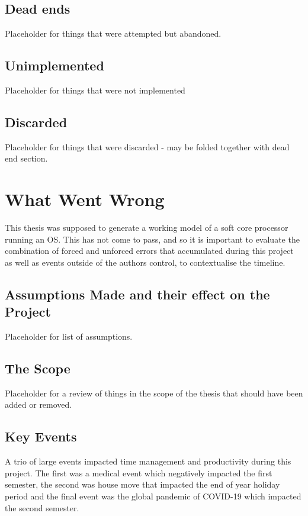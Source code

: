 	\subsection{Dead ends}
	Placeholder for things that were attempted but abandoned.
	
	\subsection{Unimplemented}
	Placeholder for things that were not implemented
	
	\subsection{Discarded}
	Placeholder for things that were discarded - may be folded together with dead end section.
	
\section{What Went Wrong}
	This thesis was supposed to generate a working model of a soft core processor running an OS. This has not come to pass, and so it is important to evaluate the combination of forced and unforced errors that accumulated during this project as well as events outside of the authors control, to contextualise the timeline.
	
	\subsection{Assumptions Made and their effect on the Project}
		Placeholder for list of assumptions.
		
	\subsection{The Scope}
		Placeholder for a review of things in the scope of the thesis that should have been added or removed.
	
	\subsection{Key Events}
		A trio of large events impacted time management and productivity during this project. The first was a medical event which negatively impacted the first semester, the second was house move that impacted the end of year holiday period and the final event was the global pandemic of COVID-19 which impacted the second semester.
		

